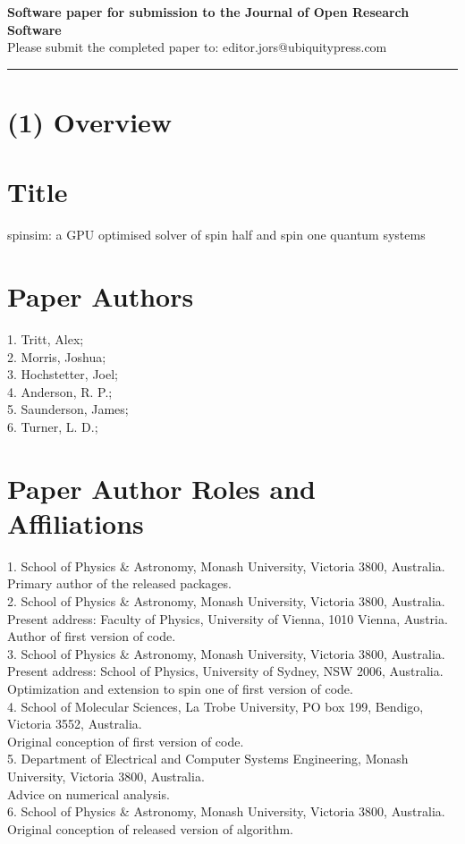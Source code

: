 \documentclass{jors}
\begin{document}
{\bf Software paper for submission to the Journal of Open Research Software} \\

Please submit the completed paper to: editor.jors@ubiquitypress.com

\rule{\textwidth}{1pt}

\section*{(1) Overview}

\vspace{0.5cm}

\section*{Title}
spinsim: a GPU optimised solver of spin half and spin one quantum systems

\section*{Paper Authors}
1. Tritt, Alex;\\
2. Morris, Joshua;\\
3. Hochstetter, Joel;\\
4. Anderson, R. P.;\\
5. Saunderson, James;\\
6. Turner, L. D.;\\

\section*{Paper Author Roles and Affiliations}
1. School of Physics \& Astronomy, Monash University, Victoria 3800, Australia.\\
	Primary author of the released packages.\\
2. School of Physics \& Astronomy, Monash University, Victoria 3800, Australia.\\
	Present address: Faculty of Physics, University of Vienna, 1010 Vienna, Austria.\\
	Author of first version of code.\\
3. School of Physics \& Astronomy, Monash University, Victoria 3800, Australia.\\
	Present address: School of Physics, University of Sydney, NSW 2006, Australia.\\
	Optimization and extension to spin one of first version of code.\\
4. School of Molecular Sciences, La Trobe University, PO box 199, Bendigo, Victoria 3552, Australia.\\
	Original conception of first version of code.\\
5. Department of Electrical and Computer Systems Engineering, Monash University, Victoria 3800, Australia.\\
	Advice on numerical analysis.\\
6. School of Physics \& Astronomy, Monash University, Victoria 3800, Australia.\\
	Original conception of released version of algorithm.
\end{document}
